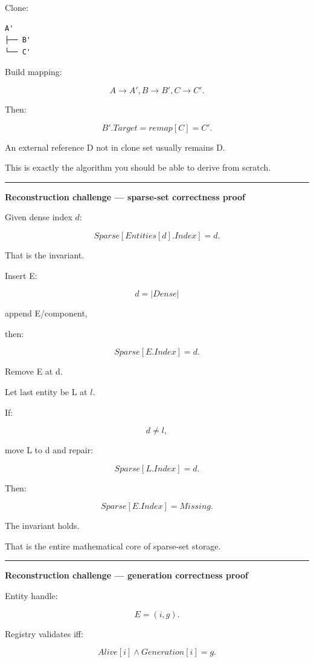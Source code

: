 Clone:

\begin{verbatim}
A'
├── B'
└── C'
\end{verbatim}

Build mapping:

\[
A\rightarrow A',
B\rightarrow B',
C\rightarrow C'.
\]

Then:

\[
B'.Target
=
remap[C]
=
C'.
\]

An external reference D not in clone set usually remains D.

This is exactly the algorithm you should be able to derive from scratch.

\begin{center}\rule{0.5\linewidth}{0.5pt}\end{center}

\textbf{Reconstruction challenge --- sparse-set correctness proof}

Given dense index \(d\):

\[
Sparse[Entities[d].Index]=d.
\]

That is the invariant.

Insert E:

\[
d=|Dense|
\]

append E/component,

then:

\[
Sparse[E.Index]=d.
\]

Remove E at d.

Let last entity be L at \(l\).

If:

\[
d\neq l,
\]

move L to d and repair:

\[
Sparse[L.Index]=d.
\]

Then:

\[
Sparse[E.Index]=Missing.
\]

The invariant holds.

That is the entire mathematical core of sparse-set storage.

\begin{center}\rule{0.5\linewidth}{0.5pt}\end{center}

\textbf{Reconstruction challenge --- generation correctness proof}

Entity handle:

\[
E=(i,g).
\]

Registry validates iff:

\[
Alive[i]
\land
Generation[i]=g.
\]

